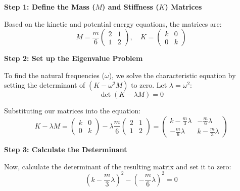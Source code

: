 \documentclass[a4paper,11pt]{article}
\begin{document}
\textbf{Step 1: Define the Mass ($M$) and Stiffness ($K$) Matrices}

Based on the kinetic and potential energy equations, the matrices are:
\begin{equation}
    M = \frac{m}{6} 
    \begin{pmatrix} 
        2 & 1 \\ 
        1 & 2 
    \end{pmatrix}, \quad
    K = 
    \begin{pmatrix} 
        k & 0 \\ 
        0 & k 
    \end{pmatrix}
\end{equation}

\vspace{0.5cm}
\textbf{Step 2: Set up the Eigenvalue Problem}

To find the natural frequencies ($\omega$), we solve the characteristic equation by setting the determinant of $(K - \omega^2 M)$ to zero. Let $\lambda = \omega^2$:
\begin{equation}
    \det(K - \lambda M) = 0
\end{equation}

Substituting our matrices into the equation:
\begin{equation}
    K - \lambda M = 
    \begin{pmatrix} 
        k & 0 \\ 
        0 & k 
    \end{pmatrix} 
    - \lambda \frac{m}{6} 
    \begin{pmatrix} 
        2 & 1 \\ 
        1 & 2 
    \end{pmatrix}
    = 
    \begin{pmatrix} 
        k - \frac{m}{3}\lambda & -\frac{m}{6}\lambda \\ 
        -\frac{m}{6}\lambda & k - \frac{m}{3}\lambda 
    \end{pmatrix}
\end{equation}

\vspace{0.5cm}
\textbf{Step 3: Calculate the Determinant}

Now, calculate the determinant of the resulting matrix and set it to zero:
\begin{equation}
    \left(k - \frac{m}{3}\lambda\right)^2 - \left(-\frac{m}{6}\lambda\right)^2 = 0
\end{equation}
\end{document}

